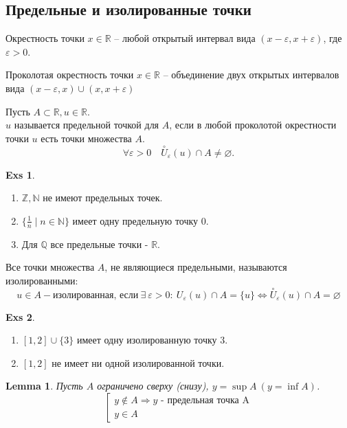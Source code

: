 \documentclass[11pt]{book}
\newcommand{\Z}{\mathbb{Z}}
\newcommand{\N}{\mathbb{N}}
\newcommand{\R}{\mathbb{R}}
\newcommand{\Q}{\mathbb{Q}}
\theoremstyle{definition}
\theoremstyle{plain}
\theoremstyle{plain}
\newtheorem*{lm}{Lemma}
\theoremstyle{definition}
\newtheorem*{exs}{Exs}
\theoremstyle{remark}
\begin{document}
\subsection{Предельные и изолированные точки}\label{ques_9}
\begin{defn}
    Окрестность точки $x \in \R$ -- любой открытый интервал вида $(x-\varepsilon , x+\varepsilon )$, где $\varepsilon >0$.
\end{defn}
\begin{defn}
    Проколотая окрестность точки $x \in \R$ -- объединение двух открытых интервалов вида $(x-\varepsilon , x) \cup (x, x+\varepsilon )$
\end{defn}
\begin{defn}
    Пусть $A \subset \R, u \in \R$.\\
    $u $ называется предельной точкой для $A$, если в любой проколотой окрестности точки  $u$ есть точки множества $A$.
    \[
	\forall \varepsilon > 0 \quad \stackrel{{\circ}} U_{\varepsilon }(u) \cap A \ne \varnothing
    .\] 
\end{defn}
\begin{exs}$ $
    \begin{enumerate}
        \item $\Z, \N $ не имеют предельных точек.
	\item $\{\frac{1}{n}\mid n \in \N\}$ имеет одну предельную точку 0.
	\item Для $\Q$ все предельные точки - $\R$.
    \end{enumerate}
\end{exs}
\begin{defn}
    Все точки множества $A$, не являющиеся предельными, называются изолированными:
    $$u \in A - \mbox{изолированная, если} ~\exists ~\varepsilon > 0 : ~U_\varepsilon (u) \cap A = \{u\} \Leftrightarrow \stackrel{\circ} U_\varepsilon (u) \cap A = \varnothing$$ 
\end{defn}
\begin{exs}$ $
    \begin{enumerate}
	\item $[1, 2] \cup \{3\}$ имеет одну изолированную точку $3$.
	\item $[1, 2]$ не имеет ни одной изолированной точки.
    \end{enumerate}
\end{exs}
\begin{lm}
      Пусть  $A$  ограничено сверху (снизу),  $y = \sup{A} ~(y = \inf{A})$.
      $$
      \left [ 
      \begin{array}{l}
      y \notin A \Rightarrow \mbox{$y$ - предельная точка  A}\\
	y \in A
      \end{array}
      \right .
      $$
\end{lm}
\end{document}
